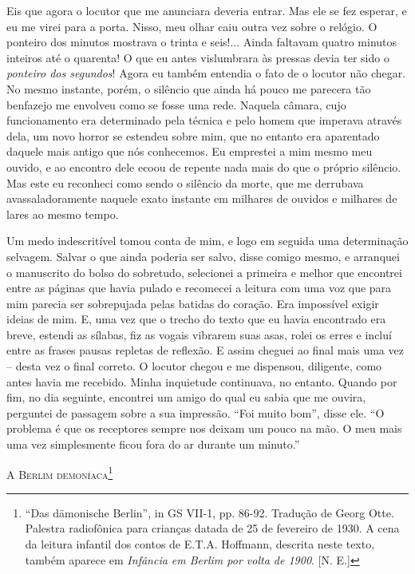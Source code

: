 Eis que agora o locutor que me anunciara deveria entrar. Mas ele se fez
esperar, e eu me virei para a porta. Nisso, meu olhar caiu outra vez
sobre o relógio. O ponteiro dos minutos mostrava o trinta e seis!...
Ainda faltavam quatro minutos inteiros até o quarenta! O que eu antes
vislumbrara às pressas devia ter sido o \emph{ponteiro dos segundos}!
Agora eu também entendia o fato de o locutor não chegar. No mesmo
instante, porém, o silêncio que ainda há pouco me parecera tão benfazejo
me envolveu como se fosse uma rede. Naquela câmara, cujo funcionamento
era determinado pela técnica e pelo homem que imperava através dela, um
novo horror se estendeu sobre mim, que no entanto era aparentado daquele
mais antigo que nós conhecemos. Eu emprestei a mim mesmo meu ouvido, e
ao encontro dele ecoou de repente nada mais do que o próprio silêncio.
Mas este eu reconheci como sendo o silêncio da morte, que me derrubava
avassaladoramente naquele exato instante em milhares de ouvidos e
milhares de lares ao mesmo tempo.

Um medo indescritível tomou conta de mim, e logo em seguida uma
determinação selvagem. Salvar o que ainda poderia ser salvo, disse
comigo mesmo, e arranquei o manuscrito do bolso do sobretudo, selecionei
a primeira e melhor que encontrei entre as páginas que havia pulado e
recomecei a leitura com uma voz que para mim parecia ser sobrepujada
pelas batidas do coração. Era impossível exigir ideias de mim. E, uma
vez que o trecho do texto que eu havia encontrado era breve, estendi as
sílabas, fiz as vogais vibrarem suas asas, rolei os erres e incluí entre
as frases pausas repletas de reflexão. E assim cheguei ao final mais uma
vez -- desta vez o final correto. O locutor chegou e me dispensou,
diligente, como antes havia me recebido. Minha inquietude continuava, no
entanto. Quando por fim, no dia seguinte, encontrei um amigo do qual eu
sabia que me ouvira, perguntei de passagem sobre a sua impressão. ``Foi
muito bom'', disse ele. ``O problema é que os receptores sempre nos
deixam um pouco na mão. O meu mais uma vez simplesmente ficou fora do ar
durante um minuto.''

\textsc{A Berlim demoníaca}\footnote{``Das dämonische Berlin'', in GS
  VII-1, pp. 86-92. Tradução de Georg Otte. Palestra radiofônica para
  crianças datada de 25 de fevereiro de 1930. A cena da leitura infantil
  dos contos de E.T.A. Hoffmann, descrita neste texto, também aparece em
  \emph{Infância em Berlim por volta de 1900}. {[}N. E.{]}}

